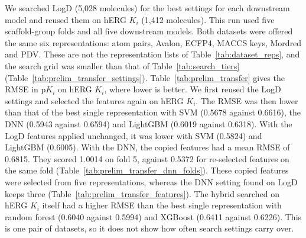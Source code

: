 
We searched LogD (5,028 molecules) for the best settings for each downstream model and reused them on hERG $K_i$ (1,412 molecules). This run used five scaffold-group folds and all five downstream models. Both datasets were offered the same six representations: atom pairs, Avalon, ECFP4, MACCS keys, Mordred and PDV. These are not the representation lists of Table~\ref{tab:dataset_reps}, and the search grid was smaller than that of Table~\ref{tab:search_tiers} (Table~\ref{tab:prelim_transfer_settings}). Table~\ref{tab:prelim_transfer} gives the RMSE in p$K_i$ on hERG $K_i$, where lower is better. We first reused the LogD settings and selected the features again on hERG $K_i$. The RMSE was then lower than that of the best single representation with SVM (0.5678 against 0.6616), the DNN (0.5943 against 0.6594) and LightGBM (0.6019 against 0.6318). With the LogD features applied unchanged, it was lower with SVM (0.5824) and LightGBM (0.6005). With the DNN, the copied features had a mean RMSE of 0.6815. They scored 1.0014 on fold 5, against 0.5372 for re-selected features on the same fold (Table~\ref{tab:prelim_transfer_dnn_folds}). These copied features were selected from five representations, whereas the DNN setting found on LogD keeps three (Table~\ref{tab:prelim_transfer_features}). The hybrid searched on hERG $K_i$ itself had a higher RMSE than the best single representation with random forest (0.6040 against 0.5994) and XGBoost (0.6411 against 0.6226). This is one pair of datasets, so it does not show how often search settings carry over.

